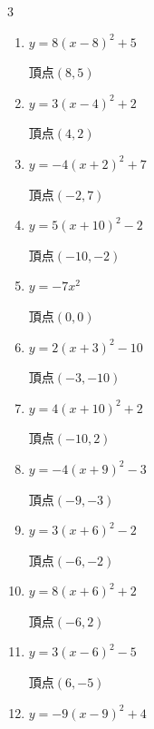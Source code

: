 \begin{multicols}{3}
\begin{enumerate}
  \item $\displaystyle y=8\left( x-8\right)^{2}+5$

        $\displaystyle 頂点\left( 8 , 5 \right)$

  \item $\displaystyle y=3\left( x-4\right)^{2}+2$

        $\displaystyle 頂点\left( 4 , 2 \right)$

  \item $\displaystyle y=-4\left( x+2\right)^{2}+7$

        $\displaystyle 頂点\left( -2 , 7 \right)$

  \item $\displaystyle y=5\left( x+10\right)^{2}-2$

        $\displaystyle 頂点\left( -10 , -2 \right)$

  \item $\displaystyle y=-7x^{2}$

        $\displaystyle 頂点\left( 0 , 0 \right)$

  \item $\displaystyle y=2\left( x+3\right)^{2}-10$

        $\displaystyle 頂点\left( -3 , -10 \right)$

\columnbreak %

  \item $\displaystyle y=4\left( x+10\right)^{2}+2$

        $\displaystyle 頂点\left( -10 , 2 \right)$

  \item $\displaystyle y=-4\left( x+9\right)^{2}-3$

        $\displaystyle 頂点\left( -9 , -3 \right)$

  \item $\displaystyle y=3\left( x+6\right)^{2}-2$

        $\displaystyle 頂点\left( -6 , -2 \right)$

  \item $\displaystyle y=8\left( x+6\right)^{2}+2$

        $\displaystyle 頂点\left( -6 , 2 \right)$

  \item $\displaystyle y=3\left( x-6\right)^{2}-5$

        $\displaystyle 頂点\left( 6 , -5 \right)$

  \item $\displaystyle y=-9\left( x-9\right)^{2}+4$


\end{enumerate}
\end{multicols}
